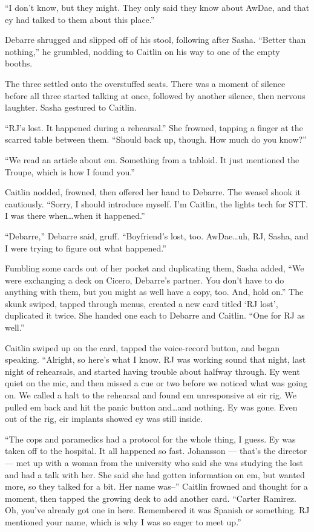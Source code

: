 ``I don't know, but they might. They only said they know about AwDae, and that ey had talked to them about this place.''

Debarre shrugged and slipped off of his stool, following after Sasha. ``Better than nothing,'' he grumbled, nodding to Caitlin on his way to one of the empty booths.

The three settled onto the overstuffed seats. There was a moment of silence before all three started talking at once, followed by another silence, then nervous laughter. Sasha gestured to Caitlin.

``RJ's lost. It happened during a rehearsal.'' She frowned, tapping a finger at the scarred table between them. ``Should back up, though. How much do you know?''

``We read an article about em. Something from a tabloid. It just mentioned the Troupe, which is how I found you.''

Caitlin nodded, frowned, then offered her hand to Debarre. The weasel shook it cautiously. ``Sorry, I should introduce myself. I'm Caitlin, the lights tech for STT. I was there when\ldots{}when it happened.''

``Debarre,'' Debarre said, gruff. ``Boyfriend's lost, too. AwDae\ldots{}uh, RJ, Sasha, and I were trying to figure out what happened.''

Fumbling some cards out of her pocket and duplicating them, Sasha added, ``We were exchanging a deck on Cicero, Debarre's partner. You don't have to do anything with them, but you might as well have a copy, too. And, hold on.'' The skunk swiped, tapped through menus, created a new card titled `RJ lost', duplicated it twice. She handed one each to Debarre and Caitlin. ``One for RJ as well.''

Caitlin swiped up on the card, tapped the voice-record button, and began speaking. ``Alright, so here's what I know. RJ was working sound that night, last night of rehearsals, and started having trouble about halfway through. Ey went quiet on the mic, and then missed a cue or two before we noticed what was going on. We called a halt to the rehearsal and found em unresponsive at eir rig. We pulled em back and hit the panic button and\ldots{}and nothing. Ey was gone. Even out of the rig, eir implants showed ey was still inside.

``The cops and paramedics had a protocol for the whole thing, I guess. Ey was taken off to the hospital. It all happened so fast. Johansson — that's the director — met up with a woman from the university who said she was studying the lost and had a talk with her. She said she had gotten information on em, but wanted more, so they talked for a bit. Her name was--'' Caitlin frowned and thought for a moment, then tapped the growing deck to add another card. ``Carter Ramirez. Oh, you've already got one in here. Remembered it was Spanish or something. RJ mentioned your name, which is why I was so eager to meet up.''

